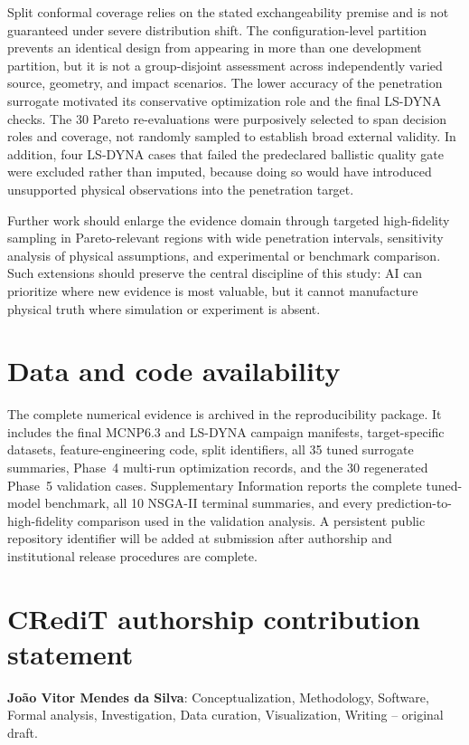 \documentclass[12pt]{elsarticle}
\begin{document}
	Split conformal coverage relies on the stated exchangeability premise and is not guaranteed under severe distribution shift. The configuration-level partition prevents an identical design from appearing in more than one development partition, but it is not a group-disjoint assessment across independently varied source, geometry, and impact scenarios. The lower accuracy of the penetration surrogate motivated its conservative optimization role and the final LS-DYNA checks. The 30 Pareto re-evaluations were purposively selected to span decision roles and coverage, not randomly sampled to establish broad external validity. In addition, four LS-DYNA cases that failed the predeclared ballistic quality gate were excluded rather than imputed, because doing so would have introduced unsupported physical observations into the penetration target.

	Further work should enlarge the evidence domain through targeted high-fidelity sampling in Pareto-relevant regions with wide penetration intervals, sensitivity analysis of physical assumptions, and experimental or benchmark comparison. Such extensions should preserve the central discipline of this study: AI can prioritize where new evidence is most valuable, but it cannot manufacture physical truth where simulation or experiment is absent.

	\section*{Data and code availability}

	The complete numerical evidence is archived in the reproducibility package. It includes the final MCNP6.3 and LS-DYNA campaign manifests, target-specific datasets, feature-engineering code, split identifiers, all 35 tuned surrogate summaries, Phase~4 multi-run optimization records, and the 30 regenerated Phase~5 validation cases. Supplementary Information reports the complete tuned-model benchmark, all 10 NSGA-II terminal summaries, and every prediction-to-high-fidelity comparison used in the validation analysis. A persistent public repository identifier will be added at submission after authorship and institutional release procedures are complete.

	\section*{CRediT authorship contribution statement}
	
	\textbf{Jo\~ao Vitor Mendes da Silva}: Conceptualization, Methodology,
	Software, Formal analysis, Investigation, Data curation, Visualization,
	Writing -- original draft.
	
\end{document}
